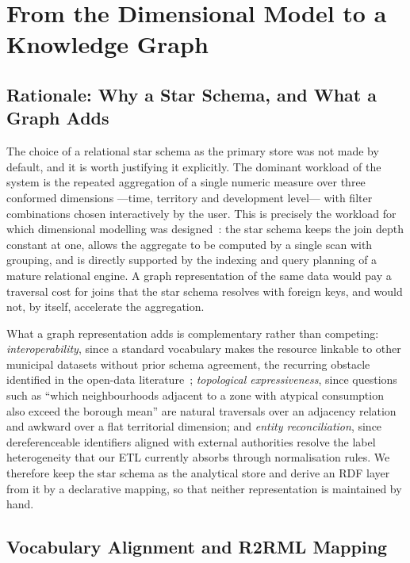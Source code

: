 \documentclass[runningheads]{llncs}
\renewcommand{\_}{\origunderscore\allowbreak}
\newif\ifshowchanges
\newenvironment{chgblock}{\ifshowchanges\color{chg}\fi}{}
\begin{document}
\begin{chgblock}
\section{From the Dimensional Model to a Knowledge Graph}
\label{sec:kg}

\subsection{Rationale: Why a Star Schema, and What a Graph Adds}

The choice of a relational star schema as the primary store was not made by
default, and it is worth justifying it explicitly. The dominant workload of the
system is the repeated aggregation of a single numeric measure over three
conformed dimensions ---time, territory and development level--- with filter
combinations chosen interactively by the user. This is precisely the workload for
which dimensional modelling was designed~\cite{kimball}: the star schema keeps
the join depth constant at one, allows the aggregate to be computed by a single
scan with grouping, and is directly supported by the indexing and query planning
of a mature relational engine. A graph representation of the same data would pay
a traversal cost for joins that the star schema resolves with foreign keys, and
would not, by itself, accelerate the aggregation.

What a graph representation adds is complementary rather than competing:
\emph{interoperability}, since a standard vocabulary makes the resource linkable
to other municipal datasets without prior schema agreement, the recurring
obstacle identified in the open-data
literature~\cite{quarati2023,nikiforova2021,weil2023};
\emph{topological expressiveness}, since questions such as ``which neighbourhoods
adjacent to a zone with atypical consumption also exceed the borough mean'' are
natural traversals over an adjacency relation and awkward over a flat territorial
dimension; and \emph{entity reconciliation}, since dereferenceable identifiers
aligned with external authorities resolve the label heterogeneity that our ETL
currently absorbs through normalisation rules. We therefore keep the star schema
as the analytical store and derive an RDF layer from it by a declarative mapping,
so that neither representation is maintained by hand.

\subsection{Vocabulary Alignment and R2RML Mapping}
\label{sec:mapping}


\end{chgblock}
\end{document}
